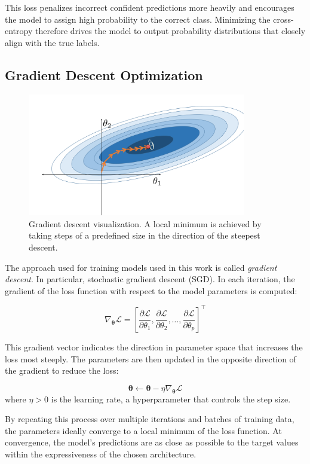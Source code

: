 \documentclass{pracalicmgr}
\begin{document}
This loss penalizes incorrect confident predictions more heavily and encourages the model to assign high probability to the correct class. Minimizing the cross-entropy therefore drives the model to output probability distributions that closely align with the true labels.

\subsection{Gradient Descent Optimization}

\begin{figure}[H]
    \centering
    \includegraphics[width=0.85\textwidth]{src/gradienDescent.png}
    \caption{Gradient descent visualization. A local minimum is achieved by taking steps of a predefined size in the direction of the steepest descent.}
\end{figure}

The approach used for training models used in this work is called \textit{gradient descent}. In particular, stochastic gradient descent (SGD). In each iteration, the gradient of the loss function with respect to the model parameters is computed:

\[
\nabla_{\boldsymbol{\theta}} \mathcal{L} = \left[ \frac{\partial \mathcal{L}}{\partial \theta_1}, \frac{\partial \mathcal{L}}{\partial \theta_2}, \dots, \frac{\partial \mathcal{L}}{\partial \theta_p} \right]^\top
\]

This gradient vector indicates the direction in parameter space that increases the loss most steeply. The parameters are then updated in the opposite direction of the gradient to reduce the loss:

\[
\boldsymbol{\theta} \leftarrow \boldsymbol{\theta} - \eta \nabla_{\boldsymbol{\theta}} \mathcal{L}
\]
where \( \eta > 0 \) is the learning rate, a hyperparameter that controls the step size.

By repeating this process over multiple iterations and batches of training data, the parameters ideally converge to a local minimum of the loss function. At convergence, the model's predictions are as close as possible to the target values within the expressiveness of the chosen architecture.
\end{document}
